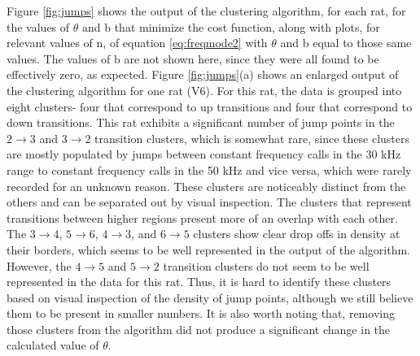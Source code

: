 \documentclass[twocolumn, prX]{revtex4}
\begin{document}
Figure \ref{fig:jumps} shows the output of the clustering algorithm, for each rat, for the values of $\theta$ and b that minimize the cost function, along with plots, for relevant values of n, of equation \ref{eq:freqmode2} with $\theta$ and b equal to those same values. The values of b are not shown here, since they were all found to be effectively zero, as expected. Figure \ref{fig:jumps}(a) shows an enlarged output of the clustering algorithm for one rat (V6). For this rat, the data is grouped into eight clusters- four that correspond to up transitions and four that correspond to down transitions. This rat exhibits a significant number of jump points in the $2\rightarrow3$ and $3\rightarrow2$ transition clusters, which is somewhat rare, since these clusters are mostly populated by jumps between constant frequency calls in the 30 kHz range to constant frequency calls in the 50 kHz and vice versa, which were rarely recorded for an unknown reason. These clusters are noticeably distinct from the others and can be separated out by visual inspection. The clusters that represent transitions between higher regions present more of an overlap with each other. The $3\rightarrow4$, $5\rightarrow6$, $4\rightarrow3$, and $6\rightarrow5$ clusters show clear drop offs in density at their borders, which seems to be well represented in the output of the algorithm. However, the $4\rightarrow5$ and $5\rightarrow2$ transition clusters do not seem to be well represented in the data for this rat. Thus, it is hard to identify these clusters based on visual inspection of the density of jump points, although we still believe them to be present in smaller numbers. It is also worth noting that, removing those clusters from the algorithm did not produce a significant change in the calculated value of $\theta$. 
\end{document}
